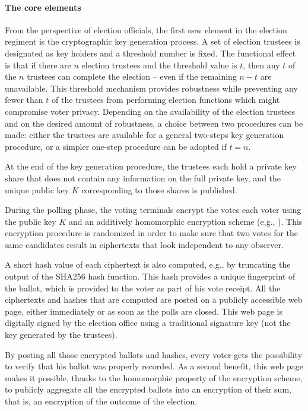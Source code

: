\label{sec:crypto}


\paragraph{The core elements}
\label{sec:crypto-core}

From the perspective of election officials, the first new element in
the election regiment is the cryptographic key generation process. A
set of election trustees is designated as key holders and a threshold
number is fixed. The functional effect is that if there are $n$
election trustees and the threshold value is $t$, then any $t$ of the
$n$ trustees can complete the election – even if the remaining $n-t$
are unavailable. This threshold mechanism provides robustness while
preventing any fewer than $t$ of the trustees from performing election
functions which might compromise voter privacy. Depending on the
availability of the election trustees and on the desired amount of
robustness, a choice between two procedures can be made: either the
trustees are available for a general two-steps key generation
procedure, or a simpler one-step procedure can be adopted if $t=n$.

At the end of the key generation procedure, the trustees each hold a
private key share that does not contain any information on the full
private key, and the unique public key $K$ corresponding to those
shares is published.

During the polling phase, the voting terminals encrypt the votes
each voter using the public key $K$ and an additively homomorphic
encryption scheme (e.g., \elgamal). This encryption procedure is
randomized in order to make sure that two votes for the same
candidates result in ciphertexts that look independent to any
observer. 

A short hash value of each ciphertext is also computed, e.g., by
truncating the output of the SHA256 hash function.  This hash provides
a unique fingerprint of the ballot, which is provided to the voter as
part of his vote receipt. All the ciphertexts and hashes that are
computed are posted on a publicly accessible web page, either
immediately or as soon as the polls are closed. This web page is
digitally signed by the election office using a traditional signature
key (not the key generated by the trustees).

By posting all those encrypted ballots and hashes, every voter gets
the possibility to verify that his ballot was properly recorded. As a
second benefit, this web page makes it possible, thanks to the
homomorphic property of the encryption scheme, to publicly aggregate
all the encrypted ballots into an encryption of their sum, that is, an
encryption of the outcome of the election.

